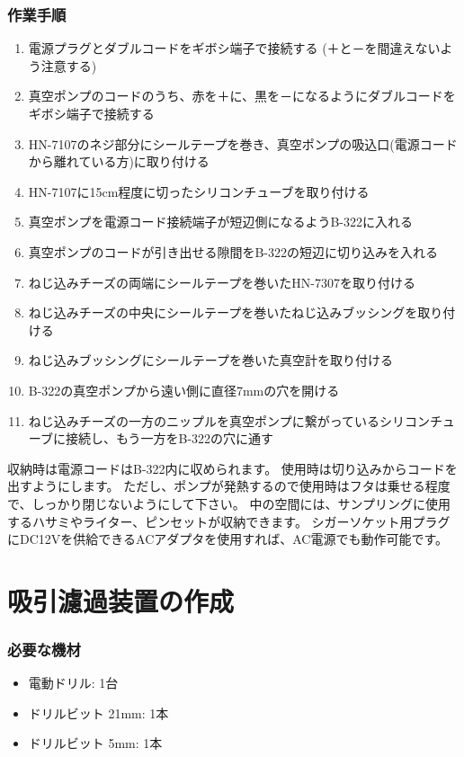 \documentclass[titlepage,10pt,a4paper,uplatex]{jsbook}
\begin{document}
\subsubsection{作業手順}
\begin{enumerate}
\item 電源プラグとダブルコードをギボシ端子で接続する (＋と－を間違えないよう注意する)
\item 真空ポンプのコードのうち、赤を＋に、黒を－になるようにダブルコードをギボシ端子で接続する
\item HN-7107のネジ部分にシールテープを巻き、真空ポンプの吸込口(電源コードから離れている方)に取り付ける
\item HN-7107に15cm程度に切ったシリコンチューブを取り付ける
\item 真空ポンプを電源コード接続端子が短辺側になるようB-322に入れる
\item 真空ポンプのコードが引き出せる隙間をB-322の短辺に切り込みを入れる
\item ねじ込みチーズの両端にシールテープを巻いたHN-7307を取り付ける
\item ねじ込みチーズの中央にシールテープを巻いたねじ込みブッシングを取り付ける
\item ねじ込みブッシングにシールテープを巻いた真空計を取り付ける
\item B-322の真空ポンプから遠い側に直径7mmの穴を開ける
\item ねじ込みチーズの一方のニップルを真空ポンプに繋がっているシリコンチューブに接続し、もう一方をB-322の穴に通す
\end{enumerate}

収納時は電源コードはB-322内に収められます。
使用時は切り込みからコードを出すようにします。
ただし、ポンプが発熱するので使用時はフタは乗せる程度で、しっかり閉じないようにして下さい。
中の空間には、サンプリングに使用するハサミやライター、ピンセットが収納できます。
シガーソケット用プラグにDC12Vを供給できるACアダプタを使用すれば、AC電源でも動作可能です。

\section{吸引濾過装置の作成}\label{makingfilteringunit}

\subsubsection{必要な機材}
\begin{itemize}
\item 電動ドリル: 1台
\item ドリルビット 21mm: 1本
\item ドリルビット 5mm: 1本
\end{itemize}
\end{document}
